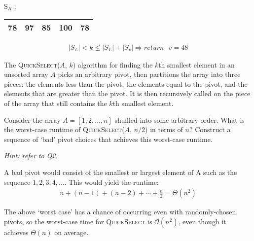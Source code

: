 \documentclass[11pt]{article}
\begin{document}
\begin{enumerate}
\begin{solution}
\begin{center}
\begin{tabular}{|c|}
                \hline
            \end{tabular}  \text{  }
            S$_R$ : 
            \begin{tabular}{|c|c|c|c|c|}
                \hline
                78 & 97 & 85 & 100 & 78\\ 
                \hline
            \end{tabular}
            \begin{align*}
                \left|S_L\right| < k \le \left|S_L\right| + \left|S_v\right| \Rightarrow return \text{ } v = 48
            \end{align*}
        \end{center}
    \end{solution}
\end{enumerate}

\newpage


The \textsc{QuickSelect}($A$, $k$) algorithm for finding the $k$th smallest element in an unsorted array $A$ picks an arbitrary pivot, 
then partitions the array into three pieces: the elements less than the pivot, the elements equal to the pivot, and the elements that are greater than the pivot.
It is then recursively called on the piece of the array that still contains the $k$th smallest element.

\begin{subparts}
    \item Consider the array $A = [ 1, 2, \ldots, n]$ shuffled into some arbitrary order. What is the worst-case runtime of \textsc{QuickSelect}($A$, $n/2$) in terms of $n$?
    Construct a sequence of `bad' pivot choices that achieves this worst-case runtime.

    \emph{Hint: refer to Q2.}\\
    \begin{solution}
        A bad pivot would consist of the smallest or largest element of A such as the sequence $1, 2, 3, 4,\dots$. This would yield the runtime:
        \begin{align*}
            n + (n - 1) + (n - 2) + \cdots + \frac{n}{2} = \Theta(n^2)
        \end{align*}
    \end{solution}

\end{subparts}

The above `worst case' has a chance of occurring even with randomly-chosen pivots, so the worst-case time for \textsc{QuickSelect} is $\mathcal{O}(n^2)$, even though it achieves $\Theta(n)$ on average.
\end{document}
